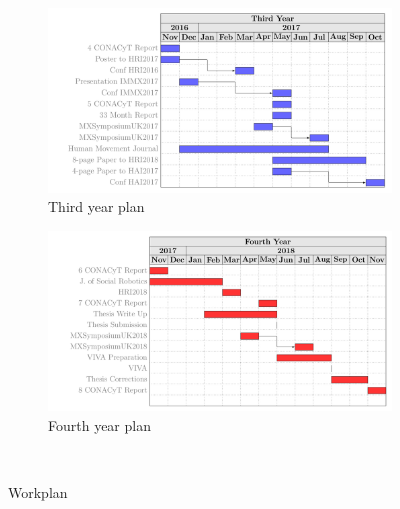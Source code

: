\documentclass{sigchi}
\begin{document}
\begin{figure}
\centering
  \begin{subfigure}[b]{0.5\textwidth}
  \includegraphics[width=0.9\columnwidth]{figures/third_year_b}
  \caption{Third year plan}
  \end{subfigure}\qquad

  \begin{subfigure}[b]{0.5\textwidth}
  \includegraphics[width=0.9\columnwidth]{figures/fourth_year_b}
  \caption{Fourth year plan}
  \end{subfigure}\qquad

  \caption{Workplan}~\label{fig:workplan}
\end{figure}




\end{document}
